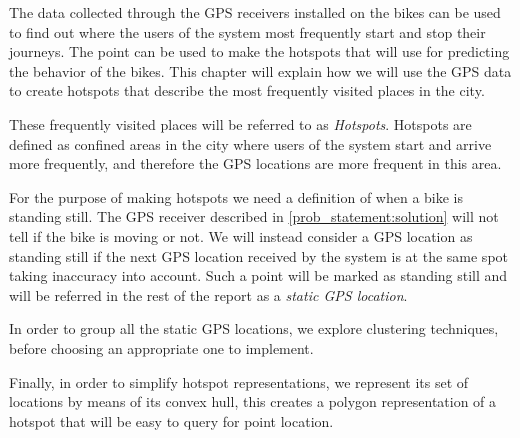The data collected through the GPS receivers installed on the bikes can be used to find out where the users of the system most frequently start and stop their journeys.
The point can be used to make the hotspots that \projectname{} will use for predicting the behavior of the bikes.
This chapter will explain how we will use the GPS data to create hotspots that describe the most frequently visited places in the city.

These frequently visited places will be referred to as \emph{Hotspots}.
Hotspots are defined as confined areas in the city where users of the system start and arrive more frequently, and therefore the GPS locations are more frequent in this area.

For the purpose of making hotspots we need a definition of when a bike is standing still.
The GPS receiver described in \ref{prob_statement:solution} will not tell if the bike is moving or not.
We will instead consider a GPS location as standing still if the next GPS location received by the system is at the same spot taking inaccuracy into account.
Such a point will be marked as standing still and will be referred in the rest of the report as a \emph{static GPS location}.

In order to group all the static GPS locations, we explore clustering techniques, before choosing an appropriate one to implement.

Finally, in order to simplify hotspot representations, we represent its set of locations by means of its convex hull, this creates a polygon representation of a hotspot that will be easy to query for point location.